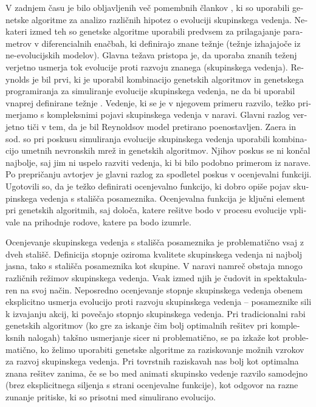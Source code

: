 \begin{slovenian}
V zadnjem času je bilo obljavljenih več pomembnih člankov \cite{kunz2006prey,olson2013predator,olson2016evolution,biswas2014causes,demsar2015simulating,demsar2016balanced,demsar2017evolution,hein2015evolution}, ki so uporabili genetske algoritme za analizo različnih hipotez o evoluciji skupinskega vedenja. Nekateri izmed teh \cite{sayers2009evolved,spector2003emergence,wood2007evolving} so genetske algoritme uporabili predvsem za prilagajanje parametrov v diferencialnih enačbah, ki definirajo znane težnje (težnje izhajajoče iz ne-evolucijskih modelov). Glavna težava pristopa je, da uporaba znanih teženj verjetno usmerja tok evolucije proti razvoju znanega (skupinskega vedenja). Reynolds je bil prvi, ki je uporabil kombinacijo genetskih algoritmov in genetskega programiranja \cite{koza1992genetic} za simuliranje evolucije skupinskega vedenja, ne da bi uporabil vnaprej definirane težnje \cite{reynolds1993evolved}. Vedenje, ki se je v njegovem primeru razvilo, težko primerjamo s kompleksnimi pojavi skupinskega vedenja v naravi. Glavni razlog verjetno tiči v tem, da je bil Reynoldsov model pretirano poenostavljen. Zaera in sod. so pri poskusu simuliranja evolucije skupinskega vedenja uporabili kombinacijo umetnih nevronskih mrež in genetskih algoritmov. Njihov poskus se ni končal najbolje, saj jim ni uspelo razviti vedenja, ki bi bilo podobno primerom iz narave. Po prepričanju avtorjev je glavni razlog za spodletel poskus v ocenjevalni funkciji. Ugotovili so, da je težko definirati ocenjevalno funkcijo, ki dobro opiše pojav skupinskega vedenja s stališča posameznika. Ocenjevalna funkcija je ključni element pri genetskih algoritmih, saj določa, katere rešitve bodo v procesu evolucije vplivale na prihodnje rodove, katere pa bodo izumrle.

Ocenjevanje skupinskega vedenja s stališča posameznika je problematično vsaj z dveh stališč. Definicija stopnje oziroma kvalitete skupinskega vedenja ni najbolj jasna, tako s stališča posameznika kot skupine. V naravi namreč obstaja mnogo različnih režimov skupinskega vedenja. Vsak izmed njih je čudovit in spektakularen na svoj način. Neposredno ocenjevanje stopnje skupinskega vedenja obenem eksplicitno usmerja evolucijo proti razvoju skupinskega vedenja -- posameznike sili k izvajanju akcij, ki povečajo stopnjo skupinskega vedenja. Pri tradicionalni rabi genetskih algoritmov (ko gre za iskanje čim bolj optimalnih rešitev pri kompleksnih nalogah) takšno usmerjanje sicer ni problematično, se pa izkaže kot problematično, ko želimo uporabiti genetske algoritme za raziskovanje možnih vzrokov za razvoj skupinskega vedenja. Pri tovrstnih raziskavah nas bolj kot optimalna znana rešitev zanima, če se bo med animati skupinsko vedenje razvilo samodejno (brez eksplicitnega siljenja s strani ocenjevalne funkcije), kot odgovor na razne zunanje pritiske, ki so prisotni med simulirano evolucijo. 


\end{slovenian}
